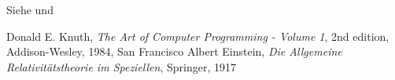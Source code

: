 \documentclass[12pt,ngerman,parskip=half]{scrartcl}
\begin{document}
\blindtext Siehe \cite{Knuth84} und \cite{Einstein1917}

\begin{thebibliography}{9}
 Donald E. Knuth, \textit{The Art of Computer Programming - Volume 1}, 2nd edition, Addison-Wesley, 1984, San Francisco
 Albert Einstein, \textit{Die Allgemeine Relativitätstheorie im Speziellen}, Springer, 1917
\end{thebibliography}
\end{document}
